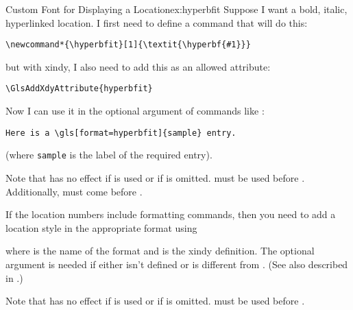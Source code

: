 \documentclass[report,inlinetitle]{nlctdoc}
\newcounter{sample}
\begin{document}
\begin{example}{Custom Font for Displaying a Location}{ex:hyperbfit}
Suppose I want a bold, italic, hyperlinked location. I first need to define a
command that will do this:
\begin{verbatim}
\newcommand*{\hyperbfit}[1]{\textit{\hyperbf{#1}}}
\end{verbatim}
but with \gls{xindy}, I also need to add this as an allowed
attribute:
\begin{verbatim}
\GlsAddXdyAttribute{hyperbfit}
\end{verbatim}
Now I can use it in the optional argument of commands like
:
\begin{verbatim}
Here is a \gls[format=hyperbfit]{sample} entry.
\end{verbatim}
(where \texttt{sample} is the label of the required entry).
\end{example}

\begin{important}
Note that  has no effect if  is
used or if  is omitted.
 must be used before .
Additionally,  must come before
.
\end{important}

If the location numbers include formatting commands, then
you need to add a location style in the appropriate format using
\begin{definition}[\DescribeMacro{\GlsAddXdyLocation}]
\end{definition}
where  is the name of the format and  is
the \gls{xindy} definition. The optional argument 
is needed if \linebreak{} either isn't defined or is
different from .
(See also  described in
.)

\begin{important}
Note that  has no effect if  is
used or if  is omitted.
 must be used before .
\end{important}
\end{document}
